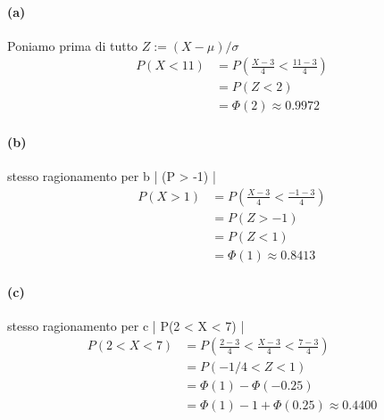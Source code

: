 \documentclass[]{article}
\begin{document}
    \paragraph{(a)} Poniamo prima di tutto $Z := (X - \mu) / \sigma$ 
    \begin{equation*}
        \begin{split}
            P(X < 11) &= P(\frac{X - 3}{4} < \frac{11 - 3}{4}) \\
            &= P(Z < 2) \\
            &= \Phi(2) \approx 0.9972
        \end{split}
    \end{equation*}

    \paragraph{(b)} stesso ragionamento per b | (P > -1) |
    \begin{equation*}
        \begin{split}
            P(X > 1) &= P(\frac{X - 3}{4} < \frac{-1 - 3}{4}) \\
            &= P(Z > -1) \\
            &= P(Z < 1) \\
            &= \Phi(1) \approx 0.8413
        \end{split}
    \end{equation*}

    \paragraph{(c)} stesso ragionamento per c | P(2 < X < 7) |
    \begin{equation*}
        \begin{split}
            P(2 < X < 7) &= P(\frac{2 - 3}{4} < \frac{X - 3}{4} < \frac{7 - 3}{4}) \\
            &= P(-1/4 < Z < 1) \\
            &= \Phi(1) - \Phi(-0.25) \\
            &= \Phi(1) - 1 + \Phi(0.25) \approx 0.4400
        \end{split}
    \end{equation*}
\end{document}
